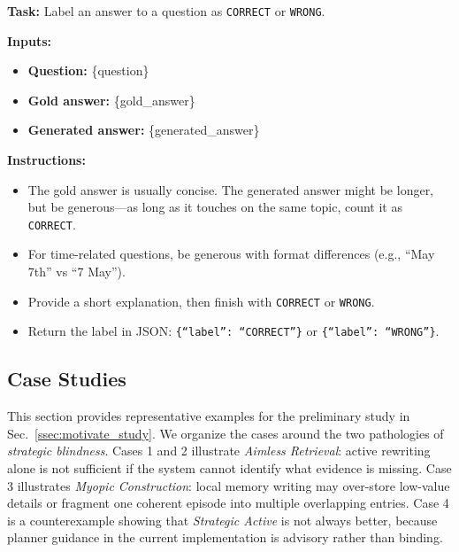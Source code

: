 \begin{table}[t]
\caption{The prompt template used for LLM-as-a-Judge evaluation.}
\begin{promptbox}
\noindent\textbf{Task:} Label an answer to a question as \texttt{CORRECT} or \texttt{WRONG}.

\medskip
\noindent\textbf{Inputs:}
\begin{itemize}[leftmargin=*]
\item \textbf{Question:} \{question\}
\item \textbf{Gold answer:} \{gold\_answer\}
\item \textbf{Generated answer:} \{generated\_answer\}
\end{itemize}

\noindent\textbf{Instructions:}
\begin{itemize}[leftmargin=*]
\item The gold answer is usually concise. The generated answer might be longer, but be generous---as long as it touches on the same topic, count it as \texttt{CORRECT}.
\item For time-related questions, be generous with format differences (e.g., ``May 7th'' vs ``7 May'').
\item Provide a short explanation, then finish with \texttt{CORRECT} or \texttt{WRONG}.
\item Return the label in JSON: \texttt{\{``label'': ``CORRECT''\}} or \texttt{\{``label'': ``WRONG''\}}.
\end{itemize}
\end{promptbox}
\label{tab:judge-prompt}
\end{table}


\subsection{Case Studies}
\label{appendix:preliminary_case_studies}
This section provides representative examples for the preliminary study in Sec.~\ref{ssec:motivate_study}.
We organize the cases around the two pathologies of \emph{strategic blindness}.
Cases 1 and 2 illustrate \emph{Aimless Retrieval}: active rewriting alone is not sufficient if the system cannot identify what evidence is missing.
Case 3 illustrates \emph{Myopic Construction}: local memory writing may over-store low-value details or fragment one coherent episode into multiple overlapping entries.
Case 4 is a counterexample showing that \textit{Strategic Active} is not always better, because planner guidance in the current implementation is advisory rather than binding.

